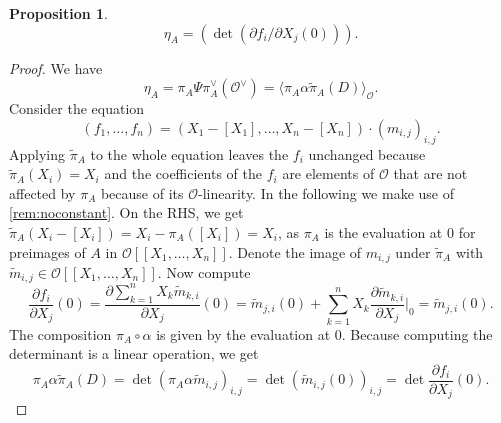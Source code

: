 \documentclass{article}
\theoremstyle{plain}%
\newtheorem{proposition}[theorem]{Proposition}
\theoremstyle{definition}
\theoremstyle{remark}
\begin{document}
\begin{proposition}\textup{\cite[proposition 5.19]{Darmon1995}}
    \[
        \eta_A = (\det(\partial f_i/\partial X_j(0))).
    \]
\end{proposition}
\begin{proof}
    We have \[
        \eta_A = \pi_A \Psi \pi_A^\vee(\mathcal{O}^\vee) = \langle\pi_A\alpha \tilde \pi_A(D)\rangle_\mathcal{O}.
    \]
    Consider the equation
    \[
        (f_1, \dots, f_n) = (X_1 - [X_1], \dots, X_n - [X_n]) \cdot (m_{i,j})_{i,j}.
    \]
    Applying \(\tilde \pi_A\) to the whole equation leaves the \(f_i\) unchanged because \(\tilde \pi_A(X_i) = X_i\)
    and the coefficients of the \(f_i\) are elements of \(\mathcal{O}\) that are not affected by \(\pi_A\)
    because of its \(\mathcal{O}\)-linearity.
    In the following we make use of \cref{rem:noconstant}.
    On the RHS, we get \(\tilde \pi_A(X_i - [X_i]) = X_i - \pi_A([X_i]) = X_i\), as \(\pi_A\) 
    is the evaluation at \(0\) for preimages of \(A\) in \(\mathcal{O}[[X_1, \dots, X_n]]\).
    Denote the image of \(m_{i,j}\) under \(\tilde \pi_A\) with \(\tilde m_{i,j} \in \mathcal{O}[[X_1, \dots, X_n]]\).
    Now compute
    \[
        \frac{\partial f_i}{\partial X_j}(0) = \frac{\partial \sum_{k=1}^n X_k\tilde m_{k,i}}{\partial X_j}(0) 
        = \tilde m_{j,i}(0) + \sum_{k=1}^n X_k \frac{\partial \tilde m_{k,i}}{\partial X_j}\bigg|_{0} 
        = \tilde m_{j,i}(0).
    \]
    The composition \(\pi_A \circ \alpha\) is given by the evaluation at \(0\).
    Because computing the determinant is a linear operation, we get
    \[
        \pi_A \alpha \tilde \pi_A(D) = \det(\pi_A\alpha \tilde m_{i,j})_{i,j} = \det(\tilde m_{i,j}(0))_{i,j}
        = \det \frac{\partial f_i}{\partial X_j}(0).
    \]
\end{proof}
\end{document}
